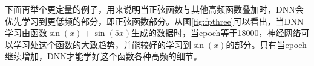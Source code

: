 下面再举个更定量的例子，用来说明当正弦函数与其他高频函数叠加时，DNN会优先学习到更低频的部分，即正弦函数部分。从图\ref{fig:fpthree}\cite{xu2019frequency}可以看出，当DNN学习由函数$\sin (x)+\sin (5x)$生成的数据时，当epoch等于18000，神经网络可以学习处这个函数的大致趋势，并能较好的学习到$\sin (x)$的部分。只有当epoch继续增加，DNN才能学好这个函数各种高频的细节。
\begin{figure}[htbp!]
    \centering

\end{figure}
